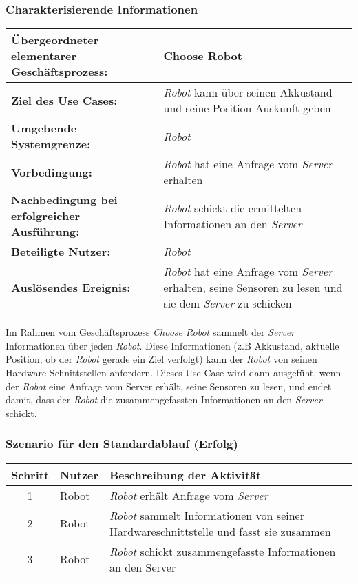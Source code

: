 			\subsubsection*{Charakterisierende Informationen}

			\begin{table}[H]
				\centering
				\begin{tabularx}{\textwidth}{@{}p{5cm}X@{}}
				\hline
				\textbf{Übergeordneter elementarer Geschäftsprozess:} & Choose Robot\\ \hline
				\textbf{Ziel des Use Cases:} & \emph{Robot} kann über seinen Akkustand und seine Position Auskunft geben\\ \hline
				\textbf{Umgebende Systemgrenze:} & \emph{Robot} \\ \hline
				\textbf{Vorbedingung:} & \emph{Robot} hat eine Anfrage vom \emph{Server} erhalten \\ \hline
				\textbf{Nachbedingung bei erfolgreicher Ausführung:} & \emph{Robot} schickt die ermittelten Informationen an den \emph{Server} \\ \hline
				\textbf{Beteiligte Nutzer:} & \emph{Robot} \\ \hline
				\textbf{Auslösendes Ereignis:} & \emph{Robot} hat eine Anfrage vom \emph{Server} erhalten, seine Sensoren zu lesen und sie dem \emph{Server} zu schicken \\
				\hline
				\end{tabularx}
			\end{table}

			Im Rahmen vom Geschäftsprozess \emph{Choose Robot} sammelt der \emph{Server}
			Informationen über jeden \emph{Robot}. Diese Informationen (z.B
			Akkustand, aktuelle Position, ob der \emph{Robot} gerade ein Ziel verfolgt)
			kann der \emph{Robot} von seinen Hardware-Schnittstellen anfordern. Dieses
			Use Case wird dann ausgefüht, wenn der \emph{Robot} eine Anfrage vom
			Server erhält, seine Sensoren zu lesen, und endet damit, dass der \emph{Robot}
			die zusammengefassten Informationen an den \emph{Server} schickt.

			\subsubsection*{Szenario für den Standardablauf (Erfolg)}

			\begin{table}[H]
				\centering
				\begin{tabularx}{\textwidth}{@{}cp{2cm}X@{}}
				\hline
				Schritt & Nutzer & Beschreibung der Aktivität \\ \hline
				1 & Robot & \emph{Robot} erhält Anfrage vom \emph{Server} \\
				2 & Robot & \emph{Robot} sammelt Informationen von seiner Hardwareschnittstelle und fasst sie zusammen \\
				3 & Robot & \emph{Robot} schickt zusammengefasste Informationen an den Server \\
				\hline
				\end{tabularx}
			\end{table}

